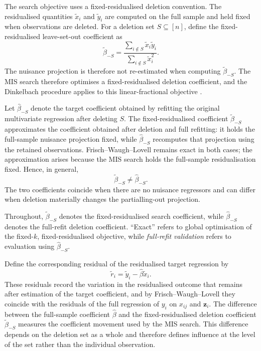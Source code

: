 \documentclass[../main.tex]{subfiles}
\begin{document}
The search objective uses a fixed-residualised deletion convention. The residualised quantities $\widetilde{x}_i$ and $\widetilde{y}_i$ are computed on the full sample and held fixed when observations are deleted. For a deletion set \(S\subseteq[n]\), define the fixed-residualised leave-set-out coefficient as
\begin{equation}
	\widetilde{\beta}_{-S}
	=
	\frac{
		\sum_{i\notin S}\widetilde{x}_i\widetilde{y}_i
	}{
		\sum_{i\notin S}\widetilde{x}_i^2
	}.
	\label{eq:fixed_residualised_beta}
\end{equation}
The nuisance projection is therefore not re-estimated when computing \(\widetilde{\beta}_{-S}\). The MIS search therefore optimises a fixed-residualised deletion coefficient, and the Dinkelbach procedure applies to this linear-fractional objective \parencite{konrad2026finding}.

Let \(\widehat{\beta}_{-S}\) denote the target coefficient obtained by refitting the original multivariate regression after deleting \(S\). The fixed-residualised coefficient \(\widetilde{\beta}_{-S}\) approximates the coefficient obtained after deletion and full refitting: it holds the full-sample nuisance projection fixed, while \(\widehat{\beta}_{-S}\) recomputes that projection using the retained observations. Frisch--Waugh--Lovell remains exact in both cases; the approximation arises because the MIS search holds the full-sample residualisation fixed. Hence, in general,
\[
\widetilde{\beta}_{-S}\neq\widehat{\beta}_{-S}.
\]
The two coefficients coincide when there are no nuisance regressors and can differ when deletion materially changes the partialling-out projection.

Throughout, \(\widetilde{\beta}_{-S}\) denotes the fixed-residualised search coefficient, while \(\widehat{\beta}_{-S}\) denotes the full-refit deletion coefficient. ``Exact'' refers to global optimisation of the fixed-\(k\), fixed-residualised objective, while \emph{full-refit validation} refers to evaluation using \(\widehat{\beta}_{-S}\).

Define the corresponding residual of the residualised target regression by
\begin{equation}
\widetilde{r}_i
=
\widetilde{y}_i-\widehat{\beta}\widetilde{x}_i.
\label{eq:target_residual}
\end{equation}
These residuals record the variation in the residualised outcome that remains after estimation of the target coefficient, and by Frisch--Waugh--Lovell they coincide with the residuals of the full regression of $y_i$ on $x_{ij}$ and $\mathbf{z}_i$. The difference between the full-sample coefficient \(\widehat{\beta}\) and the fixed-residualised deletion coefficient \(\widetilde{\beta}_{-S}\) measures the coefficient movement used by the MIS search. This difference depends on the deletion set as a whole and therefore defines influence at the level of the set rather than the individual observation.
\end{document}
